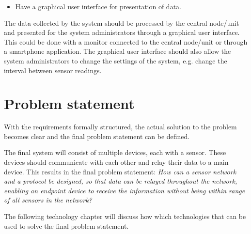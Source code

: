 \begin{itemize}
\item Have a graphical user interface for presentation of data.
\end{itemize}
The data collected by the system should be processed by the central node/unit and presented for the system administrators through a graphical user interface. This could be done with a monitor connected to the central node/unit or through a smartphone application. The graphical user interface should also allow the system administrators to change the settings of the system, e.g. change the interval between sensor readings.


\section{Problem statement}
With the requirements formally structured, the actual solution to the problem becomes clear and the final problem statement can be defined.

The final system will consist of multiple devices, each with a sensor. These devices should communicate with each other and relay their data to a main device. This results in the final problem statement:
\textit{How can a sensor network and a protocol be designed, so that data can be relayed throughout the network, enabling an endpoint device to receive the information without being within range of all sensors in the network?}

The following technology chapter will discuss how which technologies that can be used to solve the final problem statement.







